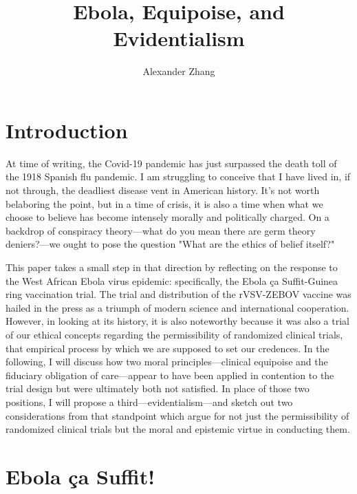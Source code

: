 \documentclass[letterpaper,notitlepage,12pt]{article}
\title{Ebola, Equipoise, and Evidentialism}
\author{Alexander Zhang}
\begin{document}
\maketitle

\section{Introduction}

At time of writing, the Covid-19 pandemic has just surpassed the death toll of
the 1918 Spanish flu pandemic.
I am struggling to conceive that I have lived in, if not through, the deadliest
disease vent in American history.
It's not worth belaboring the point, but in a time of crisis, it is also a time
when what we choose to believe has become intensely morally and politically
charged.
On a backdrop of conspiracy theory---what do you mean there are germ theory
deniers?---we ought to pose the question "What are the ethics of belief itself?"

This paper takes a small step in that direction by reflecting on the response to
the West African Ebola virus epidemic: specifically, the Ebola \c{c}a
Suffit-Guinea ring vaccination trial.
The trial and distribution of the rVSV-ZEBOV vaccine was hailed in the press as
a triumph of modern science and international cooperation.
However, in looking at its history, it is also noteworthy because it was also a
trial of our ethical concepts regarding the permissibility of randomized
clinical trials, that empirical process by which we are supposed to set our
credences.
In the following, I will discuss how two moral principles---clinical equipoise
and the fiduciary obligation of care---appear to have been applied in contention
to the trial design but were ultimately both not satisfied.
In place of those two positions, I will propose a third---evidentialism---and
sketch out two considerations from that standpoint which argue for not just the
permissibility of randomized clinical trials but the moral and epistemic virtue
in conducting them.

\section{Ebola \c{c}a Suffit!}
\end{document}
